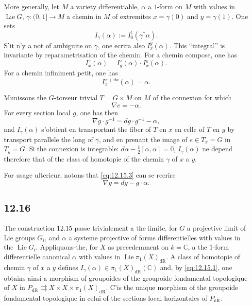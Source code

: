 \documentclass[12pt,a4paper]{article}
\theoremstyle{plain}
\theoremstyle{definition}
\theoremstyle{remark}
\DeclareMathOperator{\Lie}{Lie}
\newcommand{\bC}{\mathbb{C}}
\newcommand{\dr}{\mathrm{dR}}
\begin{document}
More generally, let $M$ a variety differentiable, $\alpha$ a $1$-form on $M$ with values in $\Lie G$, $\gamma : (0,1] \to M$ a chemin in $M$ of extremites $x = \gamma(0)$ and $y = \gamma(1)$. One sets
\[
I_\gamma(\alpha) := I_0^1(\gamma^* \alpha).
\]
S'it n'y a not of ambiguite on $\gamma$, one ecrira also $I_x^y(\alpha)$. This ``integral'' is invariante by reparametrisation of the chemin. For a chemin compose, one has
\begin{equation}\label{eq:12.15.1}
I_x^z(\alpha) = I_y^z(\alpha) \cdot I_x^y(\alpha).
\end{equation}
For a chemin infiniment petit, one has
\begin{equation}\label{eq:12.15.2}
I_x^{x+dx}(\alpha) = \alpha.
\end{equation}

Munissons the $G$-torseur trivial $T = G \times M$ on $M$ of the connexion for which
\[
\nabla e = -\alpha.
\]
For every section local $g$, one has then
\begin{equation}\label{eq:12.15.3}
\nabla g \cdot g^{-1} = dg \cdot g^{-1} - \alpha,
\end{equation}
and $I_\gamma(\alpha)$ s'obtient en transportant the fiber of $T$ en $x$ en celle of $T$ en $y$ by transport parallele the long of $\gamma$, and en prenant the image of $e \in T_x = G$ in $T_y = G$. Si the connexion is integrable: $d\alpha - \frac{1}{2}[\alpha,\alpha] = 0$, $I_\gamma(\alpha)$ ne depend therefore that of the class of homotopie of the chemin $\gamma$ of $x$ a $y$.

For usage ulterieur, notons that \eqref{eq:12.15.3} can se recrire
\begin{equation}\label{eq:12.15.4}
\nabla g = dg - g \cdot \alpha.
\end{equation}

\subsection*{12.16}

The construction 12.15 passe trivialement a the limite, for $G$ a projective limit of Lie groups $G_i$, and $\alpha$ a systeme projective of forms differentielles with values in the $\Lie G_i$. Appliquons-the, for $X$ as precedemment on $k = \bC$, a the $1$-form differentielle canonical $\alpha$ with values in $\Lie \pi_1(X)_{\dr}$. A class of homotopie of chemin $\gamma$ of $x$ a $y$ defines $I_\gamma(\alpha) \in \pi_1(X)_{\dr}(\bC)$ and, by \eqref{eq:12.15.1}, one obtains ainsi a morphism of groupoides of the groupoide fondamental topologique of $X$ in $P_{\dr} \rightrightarrows X \times X \times \pi_1(X)_{\dr}$. C'is the unique morphism of the groupoide fondamental topologique in celui of the sections local horizontales of $P_{\dr}$.
\end{document}
